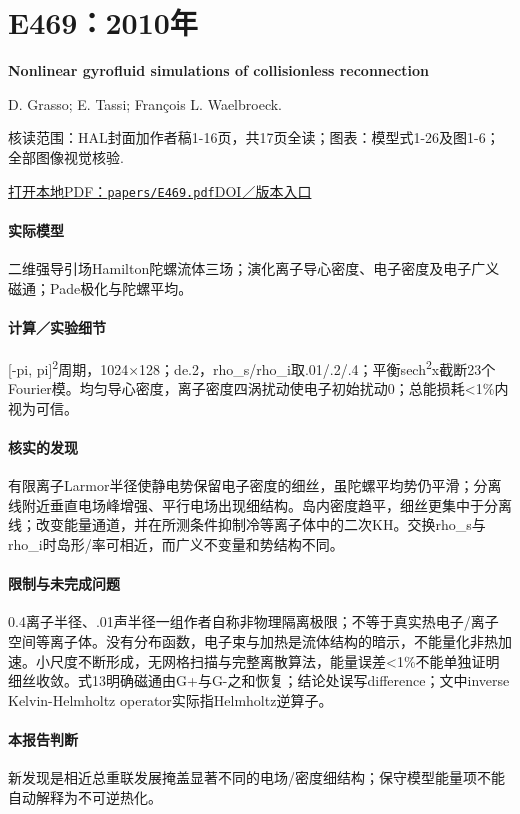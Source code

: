 \section{E469：2010年}\label{paper:E469}

\textbf{Nonlinear gyrofluid simulations of collisionless reconnection}\citep{E469}\

D. Grasso;  E. Tassi;  François L. Waelbroeck.

\textsf{核读范围：}HAL封面加作者稿1-16页，共17页全读；\textsf{图表：}模型式1-26及图1-6；全部图像视觉核验.

\href{run:papers/E469.pdf}{打开本地PDF：\texttt{papers/E469.pdf}}\quad\href{https://doi.org/10.1063/1.3475440}{DOI／版本入口}

\paragraph{实际模型}二维强导引场Hamilton陀螺流体三场；演化离子导心密度、电子密度及电子广义磁通；Pade极化与陀螺平均。

\paragraph{计算／实验细节}[-pi, pi]\textsuperscript{2}周期，1024×128；de.2，rho\_s/rho\_i取.01/.2/.4；平衡sech\textsuperscript{2}x截断23个Fourier模。均匀导心密度，离子密度四涡扰动使电子初始扰动0；总能损耗<1\%内视为可信。

\paragraph{核实的发现}有限离子Larmor半径使静电势保留电子密度的细丝，虽陀螺平均势仍平滑；分离线附近垂直电场峰增强、平行电场出现细结构。岛内密度趋平，细丝更集中于分离线；改变能量通道，并在所测条件抑制冷等离子体中的二次KH。交换rho\_s与rho\_i时岛形/率可相近，而广义不变量和势结构不同。

\paragraph{限制与未完成问题}0.4离子半径、.01声半径一组作者自称非物理隔离极限；不等于真实热电子/离子空间等离子体。没有分布函数，电子束与加热是流体结构的暗示，不能量化非热加速。小尺度不断形成，无网格扫描与完整离散算法，能量误差<1\%不能单独证明细丝收敛。式13明确磁通由G+与G-之和恢复；结论处误写difference；文中inverse Kelvin-Helmholtz operator实际指Helmholtz逆算子。

\paragraph{本报告判断}新发现是相近总重联发展掩盖显著不同的电场/密度细结构；保守模型能量项不能自动解释为不可逆热化。

